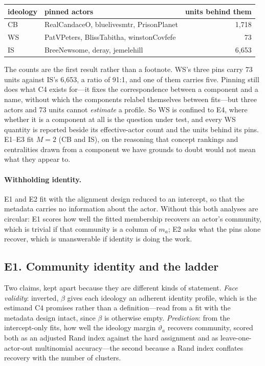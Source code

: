 \documentclass[11pt]{article}
\newcommand{\1}{\mathbb{1}}
\begin{document}
\begin{center}
\begin{tabular}{@{}llr@{}}
\toprule
ideology & pinned actors & units behind them \\
\midrule
CB & RealCandaceO, bluelivesmtr, PrisonPlanet & 1,718 \\
WS & PatVPeters, BlissTabitha, winstonCovfefe & 73 \\
IS & BreeNewsome, deray, jemelehill & 6,653 \\
\bottomrule
\end{tabular}
\end{center}

\noindent The counts are the first result rather than a footnote. WS's three pins carry 73
units against IS's 6,653, a ratio of 91:1, and one of them carries five. Pinning still does
what C4 exists for---it fixes the correspondence between a component and a name, without
which the components relabel themselves between fits---but three actors and 73 units cannot
\emph{estimate} a profile. So WS is confined to E4, where whether it is a component at all
is the question under test, and every WS quantity is reported beside its effective-actor
count and the units behind its pins. E1--E3 fit $M=2$ (CB and IS), on the reasoning that
concept rankings and centralities drawn from a component we have grounds to doubt would not
mean what they appear to.

\paragraph{Withholding identity.} E1 and E2 fit with the alignment design reduced to an
intercept, so that the metadata carries no information about the actor. Without this both
analyses are circular: E1 scores how well the fitted membership recovers an actor's
community, which is trivial if that community is a column of $m_a$; E2 asks what the pins
alone recover, which is unanswerable if identity is doing the work.

\subsection*{E1. Community identity and the ladder}
Two claims, kept apart because they are different kinds of statement. \emph{Face validity}:
inverted, $\beta$ gives each ideology an adherent identity profile, which is the estimand
C4 promises rather than a definition---read from a fit with the metadata design intact,
since $\beta$ is otherwise empty. \emph{Prediction}: from the intercept-only fits, how well
the ideology margin $\vartheta_a$ recovers community, scored both as an adjusted Rand index
against the hard assignment and as leave-one-actor-out multinomial accuracy---the second
because a Rand index conflates recovery with the number of clusters.
\end{document}
